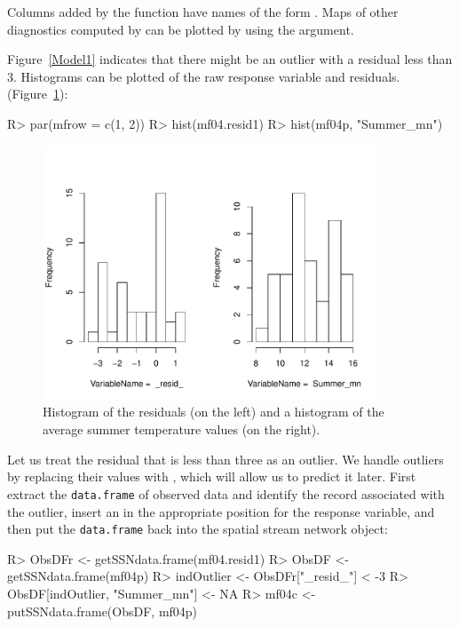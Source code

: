 \documentclass[nojss]{jss}
\renewenvironment{Schunk}{\vspace{\topsep}}{\vspace{\topsep}}
\begin{document}
Columns added by the  function have names of the form
\code{_*_}. Maps of other diagnostics computed by  can
be plotted by using the  argument.

Figure~\ref{Model1} indicates that there might be an outlier with a
residual less than 3. Histograms can be plotted of the raw
response variable and residuals.
(Figure~\ref{ResidHist}):

\begin{Schunk}
\begin{Sinput}
R> par(mfrow = c(1, 2))
R> hist(mf04.resid1)
R> hist(mf04p, "Summer_mn")
\end{Sinput}
\end{Schunk}

\begin{figure}[htbp]
  \begin{center}
    \includegraphics[keepaspectratio=true, width = 100mm]{Figures/jss984Fig-ResidHist}
    \caption{Histogram of the residuals (on the left) and a histogram of the average
      summer temperature values (on the right). \label{ResidHist}}
  \end{center}
\end{figure}

Let us treat the residual that is less than three as an outlier. We handle outliers by replacing their values with , which
will allow us to predict it later. First extract the {\tt data.frame}
of observed data and identify the record associated with the outlier,
insert an  in the appropriate position for the response
variable, and then put the {\tt data.frame} back into the spatial
stream network object:

\begin{Schunk}
\begin{Sinput}
R> ObsDFr <- getSSNdata.frame(mf04.resid1)
R> ObsDF <- getSSNdata.frame(mf04p)
R> indOutlier <- ObsDFr["_resid_"] < -3
R> ObsDF[indOutlier, "Summer_mn"] <- NA
R> mf04c <- putSSNdata.frame(ObsDF, mf04p)
\end{Sinput}
\end{Schunk}
\end{document}
